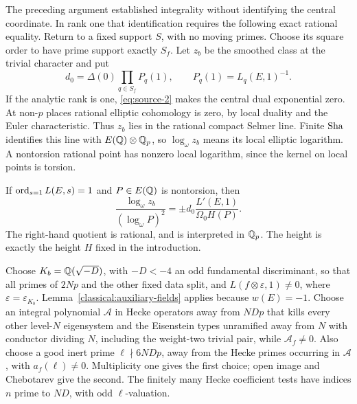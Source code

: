 The preceding argument established integrality without identifying
the central coordinate.  In rank one that identification requires
the following exact rational equality.  Return to a fixed support
\(S\), with no moving primes.  Choose its square order to have
prime support exactly \(S_f\).  Let \(z_b\) be the smoothed
class at the trivial character and put
\[
 d_0=\Delta(0)\prod_{q\in S_f}P_q(1),\qquad
 P_q(1)=L_q(E,1)^{-1}.
\]
If the analytic rank is one, \eqref{eq:source-2} makes the
central dual exponential zero.  At non-\(p\) places rational
elliptic cohomology is zero, by local duality and the Euler
characteristic.  Thus \(z_b\) lies in the rational compact
Selmer line.  Finite \(\operatorname{Sha}\) identifies this line with
\(E(\mathbb Q)\otimes\mathbb Q_p\), so \(\log_\omega z_b\) means its
local elliptic logarithm.  A nontorsion rational point has
nonzero local logarithm, since the kernel on local points is
torsion.

\begin{proposition}\label{single:logarithm}
If \(\operatorname{ord}_{s=1}L(E,s)=1\) and \(P\in E(\mathbb Q)\) is nontorsion,
then
\begin{equation}
 \frac{\log_\omega z_b}{(\log_\omega P)^2}
       =\pm d_0\frac{L'(E,1)}{\Omega_0H(P)}.
       \tag{5}\label{eq:source-5}
\end{equation}
The right-hand quotient is rational, and is interpreted in
\(\mathbb Q_p\).  The height is exactly the height \(H\) fixed in the
introduction.
\end{proposition}

Choose \(K_b=\mathbb Q(\sqrt{-D})\), with \(-D<-4\) an odd fundamental
discriminant, so that all primes of \(2Np\) and the other fixed
data split, and
\(L(f\otimes\varepsilon,1)\ne0\), where
\(\varepsilon=\varepsilon_{K_b}\).
Lemma~\ref{classical:auxiliary-fields} applies because \(w(E)=-1\).  Choose
an integral polynomial \(\mathcal A\) in Hecke operators away
from \(NDp\) that kills every other level-\(N\) eigensystem and
the Eisenstein types unramified away from \(N\) with conductor
dividing \(N\), including the weight-two trivial pair, while
\(\mathcal A_f\ne0\).
Also choose a good inert prime \(\ell\nmid6NDp\), away from
the Hecke primes occurring in \(\mathcal A\), with
\(a_f(\ell)\ne0\).  Multiplicity one gives the first choice;
open image and Chebotarev give the second.  The finitely many
Hecke coefficient tests have indices \(n\) prime to \(ND\),
with odd \(\ell\)-valuation.

